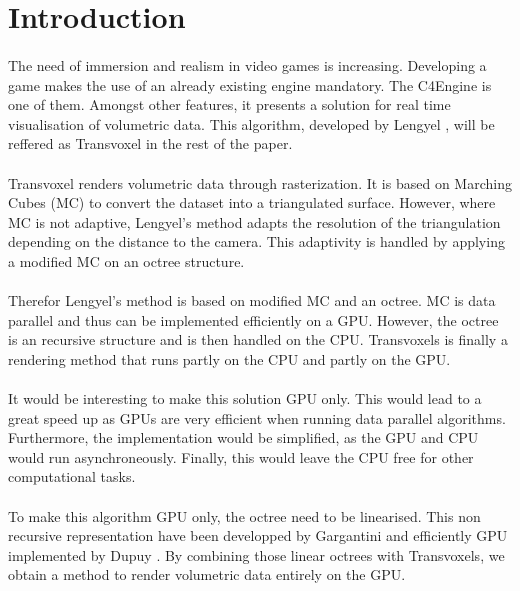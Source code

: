 \section{Introduction}

\paragraph{}
The need of immersion and realism in video games is increasing.
Developing a game makes the use of an already existing engine mandatory.
The C4Engine is one of them.
Amongst other features, it presents a solution for real time visualisation of volumetric data.
This algorithm, developed by Lengyel \cite{lengyel2010voxel}, will be reffered as Transvoxel in the rest of the paper.

\paragraph{}
Transvoxel renders volumetric data through rasterization.
It is based on Marching Cubes (MC) \cite{lorensen1987marching} to convert the dataset into a triangulated surface.
However, where MC is not adaptive, Lengyel's method adapts the resolution of the triangulation depending on the distance to the camera.
This adaptivity is handled by applying a modified MC on an octree structure.

\paragraph{}
Therefor Lengyel's method is based on modified MC and an octree.
MC is data parallel and thus can be implemented efficiently on a GPU.
However, the octree is an recursive structure and is then handled on the CPU.
Transvoxels is finally a rendering method that runs partly on the CPU and partly on the GPU.

\paragraph{}
It would be interesting to make this solution GPU only.
This would lead to a great speed up as GPUs are very efficient when running data parallel algorithms.
Furthermore, the implementation would be simplified, as the GPU and CPU would run asynchroneously.
Finally, this would leave the CPU free for other computational tasks.

\paragraph{}
To make this algorithm GPU only, the octree need to be linearised.
This non recursive representation have been developped by Gargantini \cite{gargantini1982effective} and efficiently GPU implemented by Dupuy \cite{dupuy2014quadtrees}.
By combining those linear octrees with Transvoxels, we obtain a method to render volumetric data entirely on the GPU.

